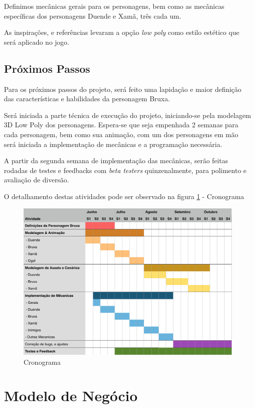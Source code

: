 Definimos mecânicas gerais para os personagens, bem como as mecânicas específicas dos personagens Duende e Xamã, três cada um.

As inspirações, e referências levaram a opção \textit{low poly} como estilo estético que será aplicado no jogo. 


\section{Próximos Passos}

Para os próximos passos do projeto, será feito uma lapidação e maior definição das características e habilidades da personagem Bruxa.

Será iniciada a parte técnica de execução do projeto, iniciando-se pela modelagem 3D Low Poly dos personagens. Espera-se que seja empenhada 2 semanas para cada personagem, bem como sua animação, com um dos personagens em mão será iniciada a implementação de mecânicas e a programação necessária.

A partir da segunda semana de implementação das mecânicas, serão feitas rodadas de testes e feedbacks com \textit{beta testers} quinzenalmente, para polimento e avaliação de diversão.

O detalhamento destas atividades pode ser observado na figura \ref{fig_crono} - Cronograma

\begin{figure}[!htb] \caption{\label{fig_crono}Cronograma} \begin{center}
\includegraphics[width=\textwidth]{imagens/crono.png} \end{center}
 \end{figure}

\chapter{Modelo de Negócio}


